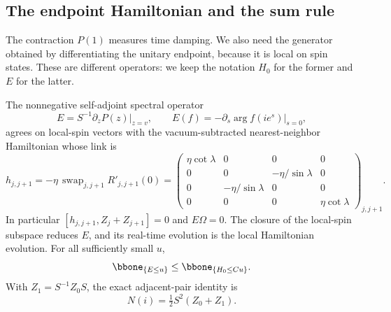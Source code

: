 \subsection{The endpoint Hamiltonian and the sum rule}

The contraction $P(1)$ measures time damping.  We also need the generator
obtained by differentiating the unitary endpoint, because it is local
on spin states.  These are different operators: we keep the notation
$H_0$ for the former and $E$ for the latter.

\begin{lemma}\label{lem:endpoint-Hamiltonian}
The nonnegative self-adjoint spectral operator
\begin{equation}\label{eq:angular-endpoint-energy}
 E=S^{-1}\partial_zP(z)\big|_{z=v},\qquad
 E(f)=-\left.\partial_s\arg f(ie^s)\right|_{s=0},
\end{equation}
agrees on local-spin vectors with the vacuum-subtracted nearest-neighbor
Hamiltonian whose link is
\begin{equation}\label{eq:angular-local-link}
 h_{j,j+1}=-\eta\,\operatorname{swap}_{j,j+1}R'_{j,j+1}(0)
 =\begin{pmatrix}
 \eta\cot\lambda&0&0&0\\
 0&0&-\eta/\sin\lambda&0\\
 0&-\eta/\sin\lambda&0&0\\
 0&0&0&\eta\cot\lambda
 \end{pmatrix}_{j,j+1}.
\end{equation}
In particular $[h_{j,j+1},Z_j+Z_{j+1}]=0$ and $E\Omega=0$.
The closure of the local-spin subspace reduces $E$, and its real-time
evolution is the local Hamiltonian evolution.  For all sufficiently
small $u$,
\begin{equation}\label{eq:angular-E-H-comparison}
 \bbone_{\{E\le u\}}\le\bbone_{\{H_0\le Cu\}}.
\end{equation}
With $Z_1=S^{-1}Z_0S$, the exact adjacent-pair identity is
\begin{equation}\label{eq:angular-adjacent-current}
 N(i)=\tfrac12 S^2(Z_0+Z_1).
\end{equation}
\end{lemma}

